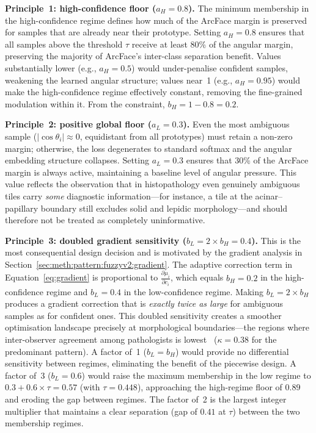 \textbf{Principle~1: high-confidence floor ($a_H = 0.8$).}
The minimum membership in the high-confidence regime defines how
much of the ArcFace margin is preserved for samples that are
already near their prototype.
Setting $a_H = 0.8$ ensures that all samples above the threshold
$\tau$ receive at least 80\% of the angular margin, preserving
the majority of ArcFace's inter-class separation benefit.
Values substantially lower (e.g., $a_H = 0.5$) would under-penalise
confident samples, weakening the learned angular structure; values
near~1 (e.g., $a_H = 0.95$) would make the high-confidence regime
effectively constant, removing the fine-grained modulation within it.
From the constraint, $b_H = 1 - 0.8 = 0.2$.

\textbf{Principle~2: positive global floor ($a_L = 0.3$).}
Even the most ambiguous sample ($|\cos\theta_i| \approx 0$,
equidistant from all prototypes) must retain a non-zero margin;
otherwise, the loss degenerates to standard softmax and the
angular embedding structure collapses.
Setting $a_L = 0.3$ ensures that 30\% of the ArcFace margin is
always active, maintaining a baseline level of angular pressure.
This value reflects the observation that in histopathology even
genuinely ambiguous tiles carry \emph{some} diagnostic
information---for instance, a tile at the acinar--papillary
boundary still excludes solid and lepidic morphology---and should
therefore not be treated as completely uninformative.

\textbf{Principle~3: doubled gradient sensitivity
($b_L = 2 \times b_H = 0.4$).}
This is the most consequential design decision and is motivated
by the gradient analysis in
Section~\ref{sec:meth:pattern:fuzzyv2:gradient}.
The adaptive correction term in
Equation~\ref{eq:gradient} is proportional to
$\frac{\partial \mu_i}{\partial c_i}$, which equals $b_H = 0.2$
in the high-confidence regime and $b_L = 0.4$ in the
low-confidence regime.
Making $b_L = 2 \times b_H$ produces a gradient correction that is
\emph{exactly twice as large} for ambiguous samples as for
confident ones.
This doubled sensitivity creates a smoother optimisation landscape
precisely at morphological boundaries---the regions where
inter-observer agreement among pathologists is
lowest~\cite{thunnissen2012reproducibility}
($\kappa = 0.38$ for the predominant pattern).
A factor of~1 ($b_L = b_H$) would provide no differential
sensitivity between regimes, eliminating the benefit of the
piecewise design.
A factor of~3 ($b_L = 0.6$) would raise the maximum membership
in the low regime to $0.3 + 0.6 \times \tau = 0.57$ (with
$\tau = 0.448$), approaching the high-regime floor of $0.89$ and
eroding the gap between regimes.
The factor of~2 is the largest integer multiplier that maintains
a clear separation (gap of $0.41$ at $\tau$) between the two
membership regimes.

